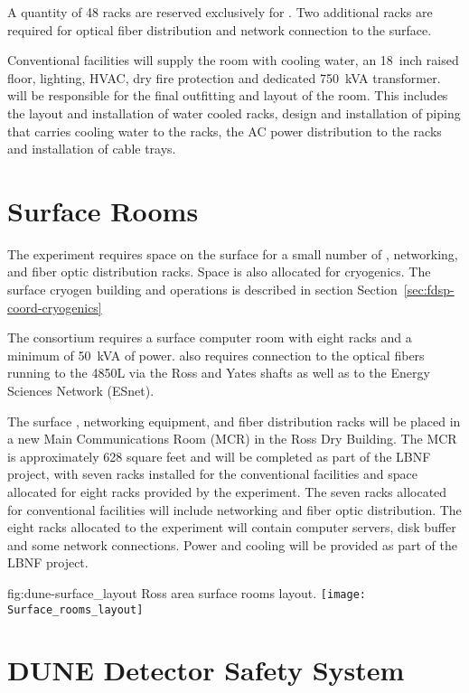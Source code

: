 A quantity of 48 racks are reserved exclusively for .  Two
additional racks are required for optical fiber distribution and
network connection to the surface.

Conventional facilities will supply the  room with cooling
water, an 18~inch raised floor, lighting, HVAC, dry fire protection
and dedicated 750~kVA transformer.   will be responsible for
the final outfitting and layout of the room.  This includes the layout
and installation of water cooled racks, design and installation of
piping that carries cooling water to the racks, the AC power
distribution to the racks and installation of cable trays.

\section{Surface Rooms}
\label{sec:fdsp-coord-surf-rooms}

The  experiment requires space on the surface for a small
number of , networking, and fiber optic distribution racks.  Space
is also allocated for cryogenics.  The surface cryogen building and
operations is described in section
Section~\ref{sec:fdsp-coord-cryogenics}

The  consortium requires a surface computer room with eight
racks and a minimum of 50~kVA of power.   also requires connection
to the optical fibers running to the 4850L via the Ross and Yates
shafts as well as to the Energy Sciences Network (ESnet).

The surface , networking equipment, and fiber distribution racks
will be placed in a new Main Communications Room (MCR) in the Ross Dry
Building.  The MCR is approximately 628 square feet and will be
completed as part of the LBNF project, with seven racks installed for
the conventional facilities and space allocated for eight racks
provided by the experiment.  The seven racks allocated for
conventional facilities will include networking and fiber optic
distribution.  The eight racks allocated to the experiment will
contain computer servers, disk buffer and some network connections.
Power and cooling will be provided as part of the LBNF project.
\begin{dunefigure}{fig:dune-surface_layout}
  {Ross area surface rooms layout.}
  \texttt{[image: Surface\_rooms\_layout]}
\end{dunefigure}

\section{DUNE Detector Safety System}
\label{sec:fdsp-coord-det-safety}



